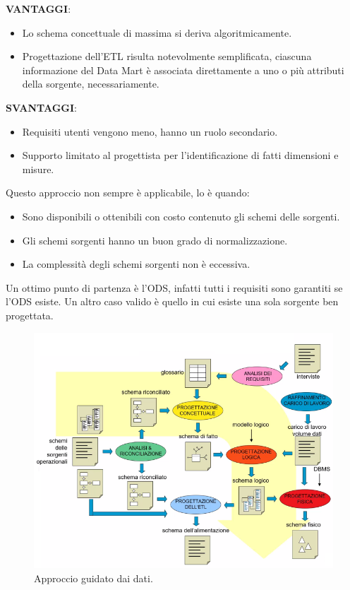 \textbf{VANTAGGI}:
\begin{itemize}
	\item Lo schema concettuale di massima si deriva algoritmicamente.
	\item Progettazione dell'ETL risulta notevolmente semplificata, ciascuna informazione del Data Mart è associata direttamente a uno o più attributi della sorgente, necessariamente.
\end{itemize}

\textbf{SVANTAGGI}:
\begin{itemize}
	\item Requisiti utenti vengono meno, hanno un ruolo secondario.
	\item Supporto limitato al progettista per l'identificazione di fatti dimensioni e misure.
\end{itemize}

Questo approccio non sempre è applicabile, lo è quando:
\begin{itemize}
	\item Sono disponibili o ottenibili con costo contenuto gli schemi delle sorgenti.
	\item Gli schemi sorgenti hanno un buon grado di normalizzazione.
	\item La complessità degli schemi sorgenti non è eccessiva.
\end{itemize}
Un ottimo punto di partenza è l'ODS, infatti tutti i requisiti sono garantiti se l'ODS esiste. Un altro caso valido è quello in cui esiste una sola sorgente ben progettata.

\begin{figure}[H]
	\begin{center}
		\includegraphics[width=0.8\linewidth]{img/data_approach.png}
		\caption{Approccio guidato dai dati.}
	\end{center}
\end{figure}

